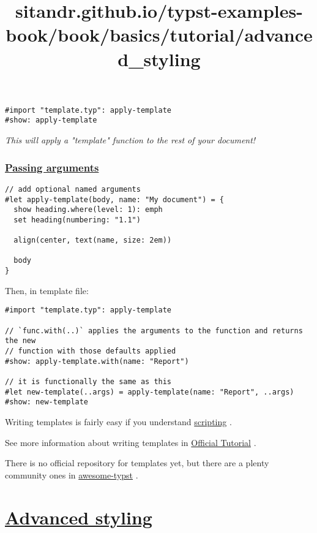 \begin{verbatim}
#import "template.typ": apply-template
#show: apply-template
\end{verbatim}

\emph{This will apply a "template" function to the rest of your
document!}

\subsubsection{\texorpdfstring{\hyperref[passing-arguments]{Passing
arguments}}{Passing arguments}}\label{passing-arguments}

\begin{verbatim}
// add optional named arguments
#let apply-template(body, name: "My document") = {
  show heading.where(level: 1): emph
  set heading(numbering: "1.1")

  align(center, text(name, size: 2em))

  body
}
\end{verbatim}

Then, in template file:

\begin{verbatim}
#import "template.typ": apply-template

// `func.with(..)` applies the arguments to the function and returns the new
// function with those defaults applied
#show: apply-template.with(name: "Report")

// it is functionally the same as this
#let new-template(..args) = apply-template(name: "Report", ..args)
#show: new-template
\end{verbatim}

Writing templates is fairly easy if you understand
\href{../scripting/index.html}{scripting} .

See more information about writing templates in
\href{https://typst.app/docs/tutorial/making-a-template/}{Official
Tutorial} .

There is no official repository for templates yet, but there are a
plenty community ones in
\href{https://github.com/qjcg/awesome-typst?ysclid=lj8pur1am7431908794\#general}{awesome-typst}
.


\title{sitandr.github.io/typst-examples-book/book/basics/tutorial/advanced_styling}

\section{\texorpdfstring{\hyperref[advanced-styling]{Advanced
styling}}{Advanced styling}}\label{advanced-styling}

